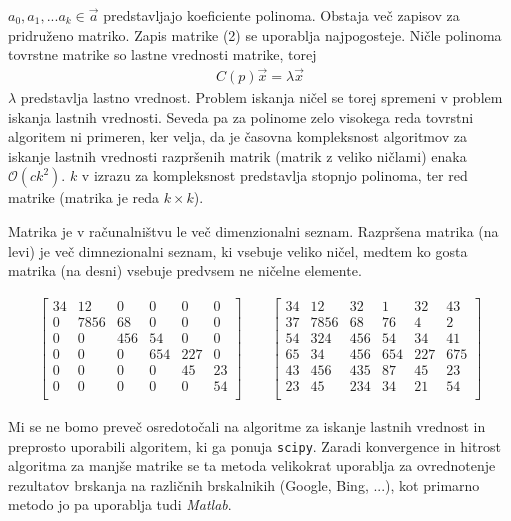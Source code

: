 $a_0, a_1, ... a_k \in \Vec{a}$ predstavljajo koeficiente polinoma. Obstaja več zapisov za pridruženo matriko. Zapis matrike (2) se uporablja najpogosteje. Ničle polinoma tovrstne matrike so lastne vrednosti matrike, torej
\begin{align}
    C(p) \Vec{x} = \lambda \Vec{x}
\end{align}
$\lambda$ predstavlja lastno vrednost. Problem iskanja ničel se torej spremeni v problem iskanja lastnih vrednosti. Seveda pa za polinome zelo visokega reda tovrstni algoritem ni primeren, ker velja, da je časovna kompleksnost algoritmov za iskanje lastnih vrednosti razpršenih matrik (matrik z veliko ničlami) enaka $\mathcal{O} (ck^2)$. $k$ v izrazu za kompleksnost predstavlja stopnjo polinoma, ter red matrike (matrika je reda $k\times k$).
\begin{primer}
    Matrika je v računalništvu le več dimenzionalni seznam. Razpršena matrika (na levi) je več dimnezionalni seznam, ki vsebuje veliko ničel, medtem ko gosta matrika (na desni) vsebuje predvsem ne ničelne elemente.

    \begin{align}
     \begin{bmatrix}
34 & 12 & 0 & 0 & 0 & 0 \\
0 & 7856 & 68 & 0 & 0 & 0  \\
0 & 0 & 456 & 54 & 0 & 0 \\
0 & 0 & 0 & 654 & 227 & 0 \\
0 & 0 & 0 & 0 & 45 & 23 \\
0 & 0 & 0 & 0 & 0 & 54 \\
\end{bmatrix}  
\qquad
         \begin{bmatrix}
34 & 12 & 32 & 1 & 32 & 43 \\
37 & 7856 & 68 & 76 & 4 & 2 \\
54 & 324 & 456 & 54 & 34 & 41 \\
65 & 34 & 456 & 654 & 227 & 675 \\
43 & 456 & 435 & 87 & 45 & 23 \\
23 & 45 & 234 & 34 & 21 & 54 \\
\end{bmatrix}  
    \end{align}
\end{primer}

Mi se ne bomo preveč osredotočali na algoritme za iskanje lastnih vrednost in preprosto uporabili algoritem, ki ga ponuja \texttt{scipy}. Zaradi konvergence in hitrost algoritma za manjše matrike se ta metoda velikokrat uporablja za ovrednotenje rezultatov brskanja na različnih brskalnikih (Google, Bing, ...), kot primarno metodo jo pa uporablja tudi \textit{Matlab}.

